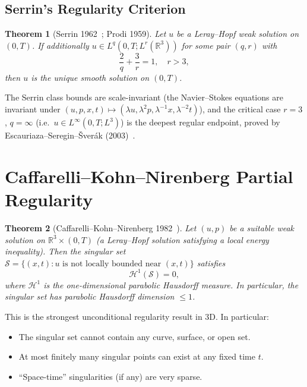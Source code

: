 \documentclass[12pt,a4paper]{article}
\newtheorem{theorem}{Theorem}[section]
\theoremstyle{remark}
\begin{document}
\subsection{Serrin's Regularity Criterion}

\begin{theorem}[Serrin 1962~\cite{Serrin1962}; Prodi 1959]
  Let $u$ be a Leray--Hopf weak solution on $(0,T)$.  If additionally
  $u \in L^q(0,T; L^r(\mathbb{R}^3))$ for some pair $(q,r)$ with
  \[
    \frac{2}{q} + \frac{3}{r} = 1, \quad r > 3,
  \]
  then $u$ is the unique smooth solution on $(0,T)$.
\end{theorem}

The Serrin class bounds are scale-invariant (the Navier--Stokes equations are invariant
under $(u,p,x,t) \mapsto (\lambda u, \lambda^2 p, \lambda^{-1}x, \lambda^{-2}t)$), and
the critical case $r=3$, $q=\infty$ (i.e.\ $u \in L^\infty(0,T; L^3)$) is the deepest
regular endpoint, proved by Escauriaza--Seregin--Šverák (2003)~\cite{ESS2003}.

\section{Caffarelli--Kohn--Nirenberg Partial Regularity}

\begin{theorem}[Caffarelli--Kohn--Nirenberg 1982~\cite{CKN1982}]
  Let $(u, p)$ be a \emph{suitable weak solution} on $\mathbb{R}^3 \times (0,T)$ (a
  Leray--Hopf solution satisfying a local energy inequality).  Then the singular set
  $\mathcal{S} = \{(x,t) : u \text{ is not locally bounded near } (x,t)\}$ satisfies
  \[
    \mathcal{H}^1(\mathcal{S}) = 0,
  \]
  where $\mathcal{H}^1$ is the one-dimensional parabolic Hausdorff measure.
  In particular, the singular set has \emph{parabolic Hausdorff dimension} $\leq 1$.
\end{theorem}

This is the strongest unconditional regularity result in 3D.  In particular:
\begin{itemize}[nosep]
  \item The singular set cannot contain any curve, surface, or open set.
  \item At most finitely many singular points can exist at any fixed time $t$.
  \item ``Space-time'' singularities (if any) are very sparse.
\end{itemize}
\end{document}
